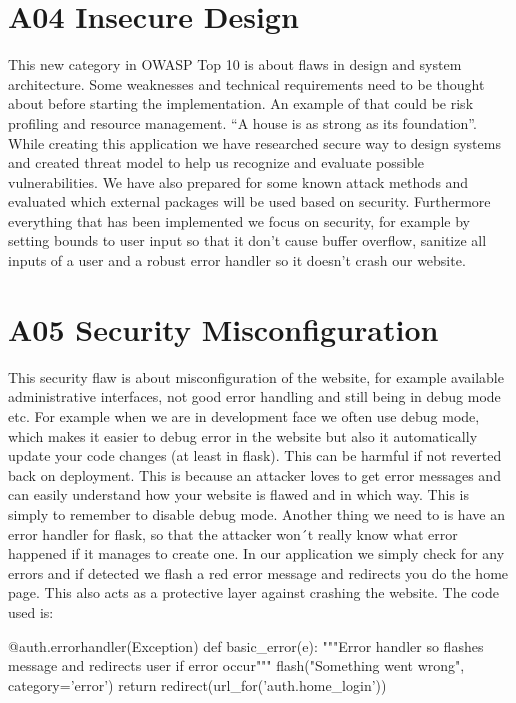 \section{A04 Insecure Design}

This new category in OWASP Top 10 is about flaws in design and system architecture. Some weaknesses and technical requirements need to be thought about before starting the implementation. An example of that could be risk profiling and resource management. “A house is as strong as its foundation”. 
While creating this application we have researched secure way to design systems and created threat model to help us recognize and evaluate possible vulnerabilities. We have also prepared for some known attack methods and evaluated which external packages will be used based on security. Furthermore everything that has been implemented we focus on security, for example by setting bounds to user input so that it don’t cause buffer overflow, sanitize all inputs of a user and a robust error handler so it doesn’t crash our website. 

\section{A05 Security Misconfiguration}

This security flaw is about misconfiguration of the website, for example available administrative interfaces, not good error handling and still being in debug mode etc.
For example when we are in development face we often use debug mode, which makes it easier to debug error in the website but also it automatically update your code changes (at least in flask). This can be harmful if not reverted back on deployment. This is because an attacker loves to get error messages and can easily understand how your website is flawed and in which way.  This is simply to remember to disable debug mode.
Another thing we need to is have an error handler for flask, so that the attacker won´t really know what error happened if it manages to create one. In our application we simply check for any errors and if detected we flash a red error message and redirects you do the home page. This also acts as a protective layer against crashing the website. The code used is:

\begin{python}
@auth.errorhandler(Exception)
def basic_error(e):
    """Error handler so flashes message
    and redirects user if error occur"""
    flash("Something went wrong", category='error')
    return redirect(url_for('auth.home_login'))
\end{python}

